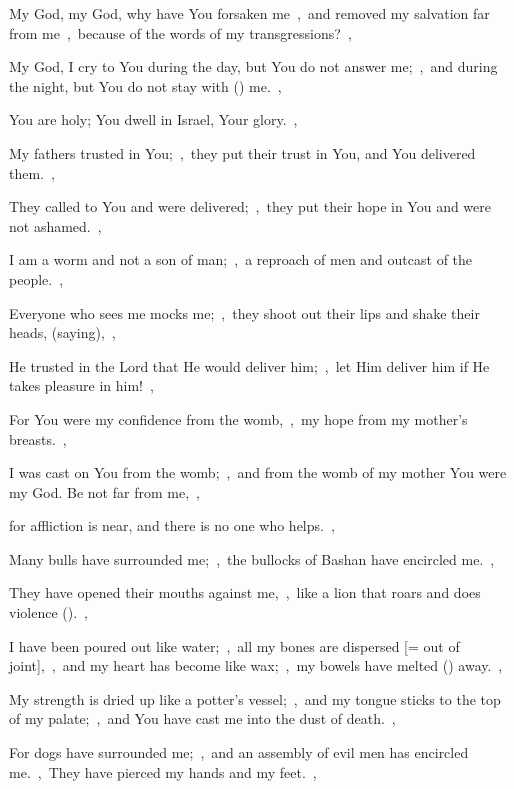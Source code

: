 \documentclass[12pt,twoside,a5paper]{article}
\begin{document}


\begin{normalparskip}
  My God, my God, why have You forsaken me~\sep\ and removed my salvation far from me~\sep\ because of the words of my transgressions?~\sep


  My God, I cry to You during the day, but You do not answer me;~\sep\ and during the night, but You do not stay with () me.~\sep

  You are holy; You dwell in Israel, Your glory.~\sep

  My fathers trusted in You;~\sep\ they put their trust in You, and You delivered them.~\sep

  They called to You and were delivered;~\sep\ they put their hope in You and were not ashamed.~\sep

  I am a worm and not a son of man;~\sep\ a reproach of men and outcast of the people.~\sep

  Everyone who sees me mocks me;~\sep\ they shoot out their lips and shake their heads, (saying),~\sep

  He trusted in the Lord that He would deliver him;~\sep\ let Him deliver him if He takes pleasure in him!~\sep

  For You were my confidence from the womb,~\sep\ my hope from my mother's breasts.~\sep

  I was cast on You from the womb;~\sep\ and from the womb of my mother You were my God. Be not far from me,~\sep

  for affliction is near, and there is no one who helps.~\sep

  Many bulls have surrounded me;~\sep\ the bullocks of Bashan have encircled me.~\sep

  They have opened their mouths against me,~\sep\ like a lion that roars and does violence ().~\sep

  I have been poured out like water;~\sep\ all my bones are dispersed [= out of joint],~\sep\ and my heart has become like wax;~\sep\ my bowels have melted () away.~\sep

  My strength is dried up like a potter's vessel;~\sep\ and my tongue sticks to the top of my palate;~\sep\ and You have cast me into the dust of death.~\sep

  For dogs have surrounded me;~\sep\ and an assembly of evil men has encircled me.~\sep\ They have pierced my hands and my feet.~\sep


\end{normalparskip}
\end{document}

